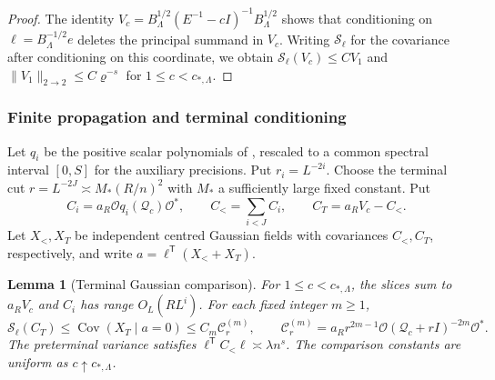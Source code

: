 \documentclass[11pt]{article}
\newtheorem{lemma}[theorem]{Lemma}
\theoremstyle{definition}
\begin{document}
\begin{proof}
The identity
\(V_c=B_\Lambda^{1/2}(E^{-1}-cI)^{-1}B_\Lambda^{1/2}\) shows
that conditioning on \(\ell=B_\Lambda^{-1/2}e\) deletes the
principal summand in \(V_c\). Writing \(\mathcal S_\ell\) for
the covariance after conditioning on this coordinate, we obtain
\(\mathcal S_\ell(V_c)\le C V_1\) and
\(\|V_1\|_{2\to2}\le C\varrho^{-s}\) for \(1\le c<c_{*,\Lambda}\).
\end{proof}

\subsubsection{Finite propagation and terminal conditioning}
\label{sec:FinitePropagationTerminalConditioning}
Let \(q_i\) be the positive scalar polynomials of
\cite[Lemma~2.1]{IsingCorrelation}, rescaled to a common spectral
interval \([0,S]\) for the auxiliary precisions. Put \(r_i=L^{-2i}\).
Choose the terminal cut \(r=L^{-2J}\asymp M_*(R/n)^2\) with
\(M_*\) a sufficiently large fixed constant. Put
\begin{equation}
 C_i=a_R\mathcal O q_i(\mathcal Q_c)\mathcal O^*,\qquad
 C_<=\sum_{i<J} C_i,\qquad C_T=a_R V_c-C_< .
\end{equation}
Let \(X_<,X_T\) be independent centred Gaussian fields with covariances \(C_<,C_T\),
respectively, and write \(a=\ell^{\mathsf T}(X_<+X_T)\).

\begin{lemma}[Terminal Gaussian comparison]
\label{lem:terminal-gaussian-comparison}
For \(1\le c<c_{*,\Lambda}\), the slices sum to \(a_RV_c\) and
\(C_i\) has range \(O_L(RL^i)\). For each fixed integer \(m\ge1\),
\begin{equation}
 \mathcal S_\ell(C_T)\le\operatorname{Cov}(X_T\mid a=0)
 \le C_m\mathcal C_r^{(m)},\qquad
 \mathcal C_r^{(m)}=
 a_R r^{2m-1}\mathcal O(\mathcal Q_c+rI)^{-2m}\mathcal O^* .
\end{equation}
The preterminal variance satisfies
\(\ell^{\mathsf T}C_<\ell\asymp\lambda n^s\). The comparison
constants are uniform as \(c\uparrow c_{*,\Lambda}\).
\end{lemma}
\end{document}
